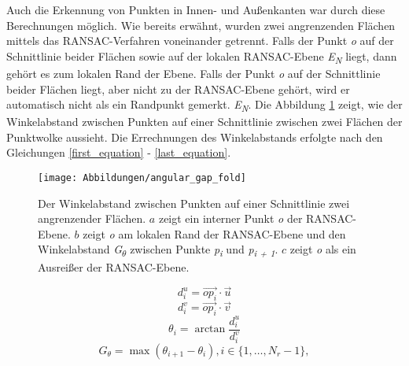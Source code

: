Auch die Erkennung von Punkten in Innen- und Außenkanten war durch diese Berechnungen möglich. Wie bereits erwähnt, wurden zwei angrenzenden Flächen mittels das RANSAC-Verfahren voneinander getrennt. Falls der Punkt \textit{o} auf der Schnittlinie beider Flächen sowie auf der lokalen RANSAC-Ebene \textit{E\textsubscript{N}} liegt, dann gehört es zum lokalen Rand der Ebene. Falls der Punkt \textit{o} auf der Schnittlinie beider Flächen liegt, aber nicht zu der RANSAC-Ebene gehört, wird er automatisch nicht als ein Randpunkt gemerkt. \textit{E\textsubscript{N}}. Die Abbildung \ref{edge_fold} zeigt, wie der Winkelabstand zwischen Punkten auf einer Schnittlinie zwischen zwei Flächen der Punktwolke aussieht. Die Errechnungen des Winkelabstands erfolgte nach den Gleichungen \ref{first_equation} - \ref{last_equation}.

\begin{figure}[h]
	\texttt{[image: Abbildungen/angular\_gap\_fold]}
	\centering
	\caption{Der Winkelabstand zwischen Punkten auf einer Schnittlinie zwei angrenzender Flächen. \textbf{\(a\)} zeigt ein interner Punkt \textit{o} der RANSAC-Ebene. \textbf{\(b\)} zeigt \textit{o} am lokalen Rand der RANSAC-Ebene und den Winkelabstand \textit{G\textsubscript{$\theta$}} zwischen Punkte \textit{p\textsubscript{i}} und \textit{p\textsubscript{i + 1}}. \textbf{\(c\)} zeigt \textit{o} als ein Ausreißer der RANSAC-Ebene. \autocite{ni_edge_2016}}
	\label{edge_fold}
\end{figure}

\begin{equation}
\label{first_equation}
d_i^u = \vec{{op}_i} \cdot \vec{u}
\end{equation}
\begin{equation}
d_i^v = \vec{{op}_i} \cdot \vec{v}
\end{equation}
\begin{equation}
\theta_i = \arctan{\frac{d_i^u}{d_i^v}}
\end{equation}
\begin{equation}
G_\theta = \max(\theta_{i + 1} - \theta_i), i \in \{1, \ldots, N_r - 1\},
\label{last_equation}
\end{equation}


